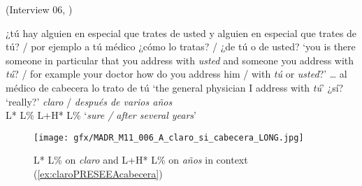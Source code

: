 \begin{exe}
\ex (Interview 06, \cite{PRESEEA.20142020})\label{ex:claroPRESEEAcabecera} 
	\begin{xlist}[A:]
	 ¿tú hay alguien en especial que trates de usted y alguien en especial que trates de tú? / por ejemplo a tú médico ¿cómo lo tratas? / ¿de tú o de usted? 
	\glt `you is there someone in particular that you address with \textit{usted} and someone you address with \textit{tú}? / for example your doctor how do you address him / with \textit{tú} or \textit{usted}?'
	\exi {} \ldots
	 al médico de cabecera lo trato de tú 
	\glt `the general physician I address with \textit{tú}' 
	 ¿sí?
	\glt `really?'
	 \textit{claro} / \textit{después de varios años} \\
	\hspace*{.5em}L* L\% \hspace{6.5em}L+H* L\% 
	\glt `\textit{sure / after several years}' 
	\end{xlist}
\end{exe}

\begin{figure}
	\texttt{[image: gfx/MADR\_M11\_006\_A\_claro\_si\_cabecera\_LONG.jpg]}
	\caption{L* L\% on \textit{claro} and L+H* L\% on \textit{años} in context (\ref{ex:claroPRESEEAcabecera}) \href{https://osf.io/96fnk/}{\faVolumeUp} \label{fig:claroPRESEEAcabeceraLONG}}
\end{figure}



